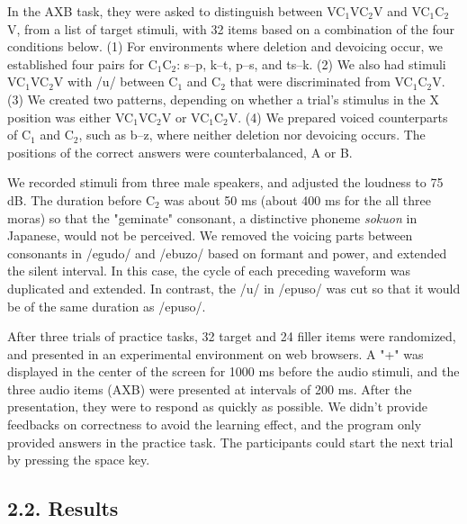 \documentclass[a4paper,11pt,twocolumn]{article}
\begin{document}
In the AXB task, they were asked to distinguish between VC$_\text{1}$VC$_\text{2}$V and VC$_\text{1}$C$_\text{2}$V, from a list of target stimuli, with 32 items based on a combination of the four conditions below. (1) For environments where deletion and devoicing occur, we established four pairs for C$_\text{1}$C$_\text{2}$: s--p, k--t, p--s, and ts--k. (2) We also had stimuli VC$_\text{1}$VC$_\text{2}$V with /u/ between C$_\text{1}$ and C$_\text{2}$ that were discriminated from VC$_\text{1}$C$_\text{2}$V. (3) We created two patterns, depending on whether a trial's stimulus in the X position was either VC$_\text{1}$VC$_\text{2}$V or VC$_\text{1}$C$_\text{2}$V. (4) We prepared voiced counterparts of C$_\text{1}$ and C$_\text{2}$, such as b--z, where neither deletion nor devoicing occurs. The positions of the correct answers were counterbalanced, A or B.

We recorded stimuli from three male speakers, and adjusted the loudness to 75 dB. The duration before C$_\text{2}$ was about 50 ms (about 400 ms for the all three moras) so that the "geminate" consonant, a distinctive phoneme \textit{sokuon} in Japanese, would not be perceived. We removed the voicing parts between consonants in /egudo/ and /ebuzo/ based on formant and power, and extended the silent interval. In this case, the cycle of each preceding waveform was duplicated and extended. In contrast, the /u/ in /epuso/ was cut so that it would be of the same duration as /epuso/.

After three trials of practice tasks, 32 target and 24 filler items were randomized, and presented in an experimental environment on web browsers. A "+" was displayed in the center of the screen for 1000 ms before the audio stimuli, and the three audio items (AXB) were presented at intervals of 200 ms. After the presentation, they were to respond as quickly as possible. We didn't provide feedbacks on correctness to avoid the learning effect, and the program only provided answers in the practice task. The participants could start the next trial by pressing the space key.

\subsection{2.2. Results}
\end{document}
